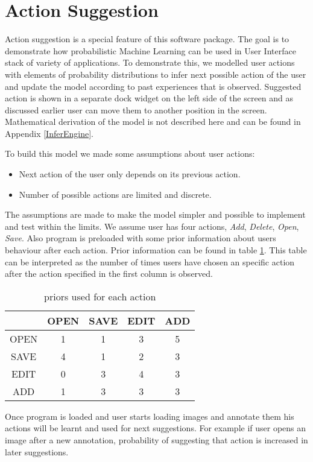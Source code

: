 \section{Action Suggestion}
Action suggestion is a special feature of this software package. The goal is to demonstrate how probabilistic Machine Learning can be used in User Interface stack of variety of applications. To demonstrate this, we modelled user actions with elements of probability distributions to infer next possible action of the user and update the model according to past experiences that is observed. Suggested action is shown in a separate dock widget on the left side of the screen and as discussed earlier user can move them to another position in the screen.
Mathematical derivation of the model is not described here and can be found in Appendix \ref{InferEngine}. 

To build this model we made some assumptions about user actions:
\begin{itemize}
\item Next action of the user only depends on its previous action.
\item Number of possible actions are limited and discrete.
\end{itemize}
The assumptions are made to make the model simpler and possible to implement and test within the limits. We assume user has four actions, {\textit{Add}, \textit{Delete}, \textit{Open}, \textit{Save}}. Also program is preloaded with some prior information about users behaviour after each action. Prior information can be found in table \ref{tab:priors}. This table can be interpreted as the number of times users have chosen an specific action after the action specified in the first column is observed.
\begin{table}[t]
\centering
\begin{tabular}{|c|c|c|c|c|}
\hline \rule[-1ex]{0pt}{3.5ex}  & OPEN & SAVE & EDIT & ADD \\ 
\hline \rule[-1ex]{0pt}{3.5ex} OPEN & 1 & 1 & 3 & 5 \\ 
\hline \rule[-1ex]{0pt}{3.5ex} SAVE & 4 & 1 & 2 & 3 \\ 
\hline \rule[-1ex]{0pt}{3.5ex} EDIT & 0 & 3 & 4 & 3 \\ 
\hline \rule[-1ex]{0pt}{3.5ex} ADD & 1 & 3 & 3 & 3 \\ 
\hline 
\end{tabular}
\caption{priors used for each action}
\label{tab:priors}
\end{table}
Once program is loaded and user starts loading images and annotate them his actions will be learnt and used for next suggestions. For example if user opens an image after a new annotation, probability of suggesting that action is increased in later suggestions.

